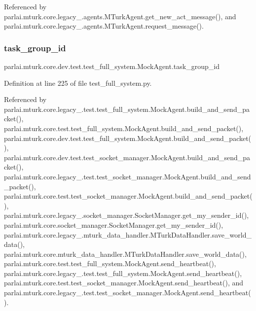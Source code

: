 Referenced by parlai.\+mturk.\+core.\+legacy\+\_.\+agents.\+M\+Turk\+Agent.\+get\+\_\+new\+\_\+act\+\_\+message(), and parlai.\+mturk.\+core.\+legacy\+\_.\+agents.\+M\+Turk\+Agent.\+request\+\_\+message().

\mbox{\label{classparlai_1_1mturk_1_1core_1_1dev_1_1test_1_1test__full__system_1_1MockAgent_af5c178fe0532006e0caa33d4af417a58}} 
\subsubsection{\texorpdfstring{task\+\_\+group\+\_\+id}{task\_group\_id}}
{\footnotesize\ttfamily parlai.\+mturk.\+core.\+dev.\+test.\+test\+\_\+full\+\_\+system.\+Mock\+Agent.\+task\+\_\+group\+\_\+id}



Definition at line 225 of file test\+\_\+full\+\_\+system.\+py.



Referenced by parlai.\+mturk.\+core.\+legacy\+\_.\+test.\+test\+\_\+full\+\_\+system.\+Mock\+Agent.\+build\+\_\+and\+\_\+send\+\_\+packet(), parlai.\+mturk.\+core.\+test.\+test\+\_\+full\+\_\+system.\+Mock\+Agent.\+build\+\_\+and\+\_\+send\+\_\+packet(), parlai.\+mturk.\+core.\+dev.\+test.\+test\+\_\+full\+\_\+system.\+Mock\+Agent.\+build\+\_\+and\+\_\+send\+\_\+packet(), parlai.\+mturk.\+core.\+dev.\+test.\+test\+\_\+socket\+\_\+manager.\+Mock\+Agent.\+build\+\_\+and\+\_\+send\+\_\+packet(), parlai.\+mturk.\+core.\+legacy\+\_.\+test.\+test\+\_\+socket\+\_\+manager.\+Mock\+Agent.\+build\+\_\+and\+\_\+send\+\_\+packet(), parlai.\+mturk.\+core.\+test.\+test\+\_\+socket\+\_\+manager.\+Mock\+Agent.\+build\+\_\+and\+\_\+send\+\_\+packet(), parlai.\+mturk.\+core.\+legacy\+\_.\+socket\+\_\+manager.\+Socket\+Manager.\+get\+\_\+my\+\_\+sender\+\_\+id(), parlai.\+mturk.\+core.\+socket\+\_\+manager.\+Socket\+Manager.\+get\+\_\+my\+\_\+sender\+\_\+id(), parlai.\+mturk.\+core.\+legacy\+\_.\+mturk\+\_\+data\+\_\+handler.\+M\+Turk\+Data\+Handler.\+save\+\_\+world\+\_\+data(), parlai.\+mturk.\+core.\+mturk\+\_\+data\+\_\+handler.\+M\+Turk\+Data\+Handler.\+save\+\_\+world\+\_\+data(), parlai.\+mturk.\+core.\+test.\+test\+\_\+full\+\_\+system.\+Mock\+Agent.\+send\+\_\+heartbeat(), parlai.\+mturk.\+core.\+legacy\+\_.\+test.\+test\+\_\+full\+\_\+system.\+Mock\+Agent.\+send\+\_\+heartbeat(), parlai.\+mturk.\+core.\+test.\+test\+\_\+socket\+\_\+manager.\+Mock\+Agent.\+send\+\_\+heartbeat(), and parlai.\+mturk.\+core.\+legacy\+\_.\+test.\+test\+\_\+socket\+\_\+manager.\+Mock\+Agent.\+send\+\_\+heartbeat().


